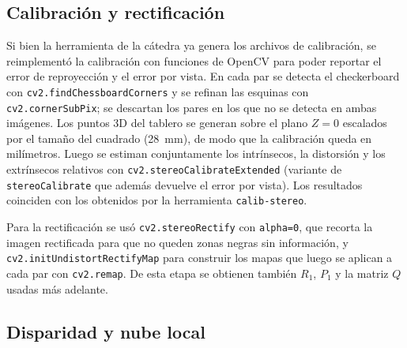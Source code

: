 \documentclass[conference]{IEEEtran}
\begin{document}
\subsection{Calibración y rectificación}

Si bien la herramienta de la cátedra ya genera los archivos de calibración,
se reimplementó la calibración con funciones de OpenCV para poder reportar el
error de reproyección y el error por vista. En cada par se detecta el
checkerboard con \texttt{cv2.findChessboardCorners} y se refinan las esquinas
con \texttt{cv2.cornerSubPix}; se descartan los pares en los que no se
detecta en ambas imágenes. Los puntos 3D del tablero se generan sobre el
plano $Z=0$ escalados por el tamaño del cuadrado (28~mm), de modo que la
calibración queda en milímetros. Luego se estiman conjuntamente los
intrínsecos, la distorsión y los extrínsecos relativos con
\texttt{cv2.stereoCalibrate}\allowbreak\texttt{Extended} (variante de
\texttt{stereoCalibrate} que además devuelve el error por vista). Los
resultados coinciden con los obtenidos por la herramienta
\texttt{calib-stereo}.

Para la rectificación se usó \texttt{cv2.stereoRectify} con
\texttt{alpha=0}, que recorta la imagen rectificada para que no queden zonas
negras sin información, y \texttt{cv2.initUndistortRectifyMap} para construir
los mapas que luego se aplican a cada par con \texttt{cv2.remap}. De esta
etapa se obtienen también $R_1$, $P_1$ y la matriz $Q$ usadas más adelante.

\subsection{Disparidad y nube local}
\end{document}

